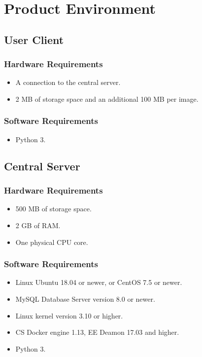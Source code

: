 \chapter{Product Environment}
  \section{User Client}
    \subsection{Hardware Requirements}
      \begin{itemize}
      \item A connection to the central server.
      \item 2 MB of storage space and an additional 100 MB per image.
      \end{itemize}
    \subsection{Software Requirements}
      \begin{itemize}
      \item Python 3.
    \end{itemize}

  \section{Central Server}
    \subsection{Hardware Requirements}
    \begin{itemize}
      \item 500 MB of storage space.
      \item 2 GB of RAM.
      \item One physical CPU core.
    \end{itemize}
    \subsection{Software Requirements}
    \begin{itemize}
      \item Linux Ubuntu 18.04 or newer, or CentOS 7.5 or newer.
      \item MySQL Database Server version 8.0 or newer.
      \item Linux kernel version 3.10 or higher.
      \item CS Docker engine 1.13, EE Deamon 17.03 and higher.
      \item Python 3.
    \end{itemize}

